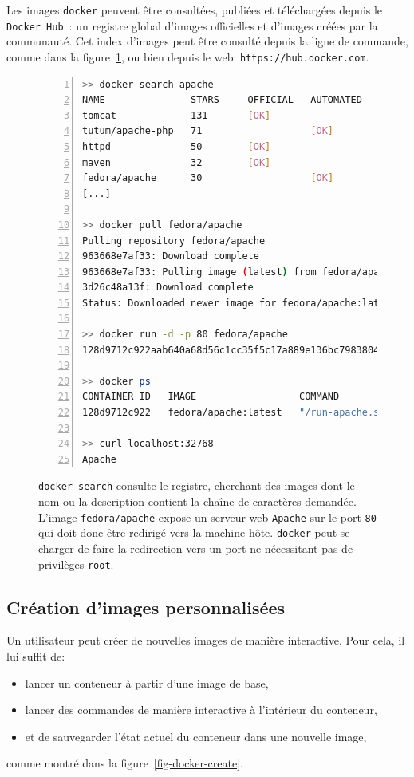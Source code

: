 \documentclass[a4paper]{article}
\begin{document}
Les images \texttt{docker} peuvent \^etre consult\'ees, publi\'ees et
t\'el\'echarg\'ees depuis le \texttt{Docker Hub}~\cite{ref-docker-hub}: un
registre global d'images officielles et d'images cr\'e\'ees par la communaut\'e.
Cet index d'images peut \^etre consult\'e depuis la ligne de commande, comme
dans la figure~\ref{fig-docker-search}, ou bien depuis le web:
\texttt{https://hub.docker.com}.

\begin{figure}[h]
	\begin{lstlisting}[language=sh,
		basicstyle=\tiny,
		frame=trbl,
		numbers=left,
		showstringspaces=false,
	stringstyle=\ttfamily]
>> docker search apache
NAME               STARS     OFFICIAL   AUTOMATED
tomcat             131       [OK]       
tutum/apache-php   71                   [OK]
httpd              50        [OK]       
maven              32        [OK]       
fedora/apache      30                   [OK]
[...]

>> docker pull fedora/apache
Pulling repository fedora/apache
963668e7af33: Download complete 
963668e7af33: Pulling image (latest) from fedora/apache 
3d26c48a13f: Download complete 
Status: Downloaded newer image for fedora/apache:latest

>> docker run -d -p 80 fedora/apache
128d9712c922aab640a68d56c1cc35f5c17a889e136bc7983804035333264d92

>> docker ps
CONTAINER ID   IMAGE                  COMMAND             PORTS
128d9712c922   fedora/apache:latest   "/run-apache.sh"    0.0.0.0:32768->80/tcp

>> curl localhost:32768
Apache

\end{lstlisting}
\caption{\label{fig-docker-search}\texttt{docker search} consulte le registre,
	cherchant des images dont le nom ou la description contient la cha\^ine de
	caract\`eres demand\'ee.
	L'image \texttt{fedora/apache} expose un serveur web \texttt{Apache} sur le
	port \texttt{80} qui doit donc \^etre redirig\'e vers la machine h\^ote.
	\texttt{docker} peut se charger de faire la redirection vers un port ne
	n\'ecessitant pas de privil\`eges \texttt{root}.
}
\end{figure}

\subsection*{Cr\'eation d'images personnalis\'ees}
Un utilisateur peut cr\'eer de nouvelles images de mani\`ere interactive.
Pour cela, il lui suffit de:
\begin{itemize}
 \item lancer un conteneur \`a partir d'une image de base,
 \item lancer des commandes de mani\`ere interactive \`a l'int\'erieur du
	 conteneur,
 \item et de sauvegarder l'\'etat actuel du conteneur dans une nouvelle image,
\end{itemize}
comme montr\'e dans la figure~\ref{fig-docker-create}.
\end{document}
